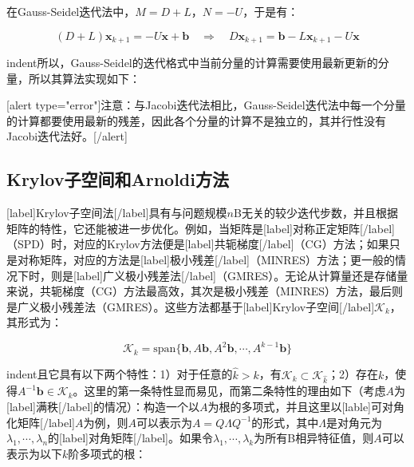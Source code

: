\documentclass[UTF8,nofonts]{ctexart}
\begin{document}
在Gauss-Seidel迭代法中，$M=D+L$，$N=-U$，于是有：

\[
(D+L)\boldsymbol{x}_{k+1}=-U\boldsymbol{x}+\boldsymbol{b}
\quad\Longrightarrow\quad
D\boldsymbol{x}_{k+1}=\boldsymbol{b}-L\boldsymbol{x}_{k+1}-U\boldsymbol{x}
\]

indent所以，Gauss-Seidel的迭代格式中当前分量的计算需要使用最新更新的分量，所以其算法实现如下：

\begin{algorithm}[H]
\end{algorithm}

[alert type="error"]注意：与Jacobi迭代法相比，Gauss-Seidel迭代法中每一个分量的计算都要使用最新的残差，因此各个分量的计算不是独立的，其并行性没有Jacobi迭代法好。[/alert]

\subsection*{Krylov子空间和Arnoldi方法}

[label]Krylov子空间法[/label]具有与问题规模$n$B无关的较少迭代步数，并且根据矩阵的特性，它还能被进一步优化。例如，当矩阵是[label]对称正定矩阵[/label]（SPD）时，对应的Krylov方法便是[label]共轭梯度[/label]（CG）方法；如果只是对称矩阵，对应的方法是[label]极小残差[/label]（MINRES）方法；更一般的情况下时，则是[label]广义极小残差法[/label]（GMRES）。无论从计算量还是存储量来说，共轭梯度（CG）方法最高效，其次是极小残差（MINRES）方法，最后则是广义极小残差法（GMRES）。这些方法都基于[label]Krylov子空间[/label]$\mathcal{K}_k$，其形式为：

\[\mathcal{K}_k=\text{span}\{\boldsymbol{b},A\boldsymbol{b},A^2\boldsymbol{b},\cdots,A^{k-1}\boldsymbol{b}\}\]

indent且它具有以下两个特性：1）对于任意的$\hat{k}>k$，有$\mathcal{K}_k\subset\mathcal{K}_{\hat{k}}$；2）存在$k$，使得$A^{-1}\boldsymbol{b}\in\mathcal{K}_k$。这里的第一条特性显而易见，而第二条特性的理由如下（考虑$A$为[label]满秩[/label]的情况）：构造一个以$A$为根的多项式，并且这里以[lable]可对角化矩阵[/label]$A$为例，则$A$可以表示为$A=Q\Lambda Q^{-1}$的形式，其中$\Lambda$是对角元为$\lambda_1,\cdots,\lambda_n$的[label]对角矩阵[/label]。如果令$\lambda_1,\cdots,\lambda_k$为所有B相异特征值，则$A$可以表示为以下$k$阶多项式的根：
\end{document}
